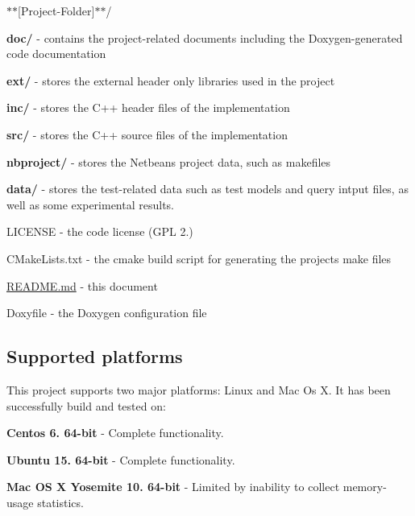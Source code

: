 \begin{DoxyItemize}
\item $\ast$$\ast${\ttfamily \mbox{[}Project-\/\+Folder\mbox{]}}$\ast$$\ast$/
\begin{DoxyItemize}
\item {\bfseries doc/} -\/ contains the project-\/related documents including the Doxygen-\/generated code documentation
\item {\bfseries ext/} -\/ stores the external header only libraries used in the project
\item {\bfseries inc/} -\/ stores the C++ header files of the implementation
\item {\bfseries src/} -\/ stores the C++ source files of the implementation
\item {\bfseries nbproject/} -\/ stores the Netbeans project data, such as makefiles
\item {\bfseries data/} -\/ stores the test-\/related data such as test models and query intput files, as well as some experimental results.
\item L\+I\+C\+E\+N\+S\+E -\/ the code license (G\+P\+L 2.)
\item C\+Make\+Lists.\+txt -\/ the cmake build script for generating the project\textquotesingle{}s make files
\item \hyperlink{_r_e_a_d_m_e_8md}{R\+E\+A\+D\+M\+E.\+md} -\/ this document
\item Doxyfile -\/ the Doxygen configuration file
\end{DoxyItemize}
\end{DoxyItemize}

\subsection*{Supported platforms}

This project supports two major platforms\+: Linux and Mac Os X. It has been successfully build and tested on\+:


\begin{DoxyItemize}
\item {\bfseries Centos 6. 64-\/bit} -\/ Complete functionality.
\item {\bfseries Ubuntu 15. 64-\/bit} -\/ Complete functionality.
\item {\bfseries Mac O\+S X Yosemite 10. 64-\/bit} -\/ Limited by inability to collect memory-\/usage statistics.
\end{DoxyItemize}

